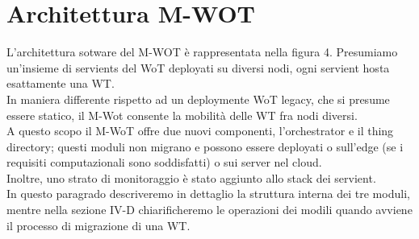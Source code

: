 \documentclass[11pt]{article}
\begin{document}
		\section{Architettura M-WOT}
		L'architettura sotware del M-WOT è rappresentata nella figura 4. Presumiamo un'insieme di servients del WoT deployati su diversi nodi, ogni servient hosta esattamente una WT. \\
		In maniera differente rispetto ad un deploymente WoT legacy, che si presume essere statico, il M-Wot consente la mobilità delle WT fra nodi diversi. \\
		A questo scopo il M-WoT offre due nuovi componenti, l'orchestrator e il thing directory; questi moduli non migrano e possono essere deployati o sull'edge (se i requisiti computazionali sono soddisfatti) o sui server nel cloud. \\
		Inoltre, uno strato di monitoraggio è stato aggiunto allo stack dei servient.\\
		In questo paragrado descriveremo in dettaglio la struttura interna dei tre moduli, mentre nella sezione IV-D chiarificheremo le operazioni dei modili quando avviene il processo di migrazione di una WT.
\end{document}
